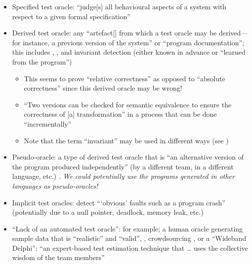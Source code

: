 \begin{itemize}
      \item Specified test oracle: ``judge[s] all behavioural aspects of a
            system with respect to a given formal specification''
            \citep[p.~510]{BarrEtAl2015}
      \item Derived test oracle: any ``artefact[] from which a
            test oracle may be derived---for instance, a previous version of
            the system'' or ``program documentation''; this includes
            ,
            \citep[p.~510]{BarrEtAl2015}, and invariant detection (either
            known in advance or ``learned from the program'')
            \citep[p.~516]{BarrEtAl2015}
            \begin{itemize}
                  \item This seems to prove ``relative correctness'' as
                        opposed to ``absolute correctness''
                        \citep[p.~345]{LahiriEtAl2013} since this derived
                        oracle may be wrong!
                  \item ``Two versions can be checked for semantic equivalence
                        to ensure the correctness of [a] transformation'' in a
                        process that can be done ``incrementally''
                        \citep[p.~345]{LahiriEtAl2013}
                  \item Note that the term ``invariant'' may be used in
                        different ways (see \citep[p.~348]{ChalinEtAl2006})
            \end{itemize}
      \item Pseudo-oracle: a type of derived test oracle that is ``an
            alternative version of the program produced independently'' (by a
            different team, in a different language, etc.)
            \citep[p.~515]{BarrEtAl2015} .
            \emph{We could potentially use the
                  programs generated in other languages as pseudo-oracles!}
      \item Implicit test oracles: detect ```obvious' faults such as a program
            crash'' (potentially due to a null pointer, deadlock, memory leak,
            etc.) \citep[p.~510]{BarrEtAl2015}
      \item ``Lack of an automated test oracle'': for example; a human oracle
            generating sample data that is ``realistic'' and ``valid'',
            \citep[pp.~510-511]{BarrEtAl2015}, crowdsourcing
            \citep[p.~520]{BarrEtAl2015}, or a ``Wideband Delphi'': ``an
            expert-based test estimation technique that … uses the collective
            wisdom of the team members'' 
\end{itemize}

